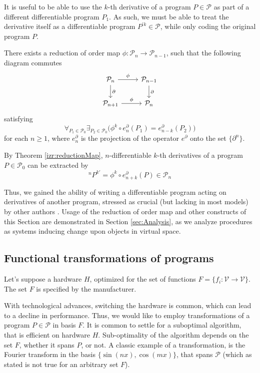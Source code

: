 \documentclass[smallcondensed]{svjour3}
\newcommand{\VV}{\mathcal{V}}
\newcommand{\dP}{\mathcal{P}}
\newcommand{\D}{\partial}
\begin{document}
 It is useful to be able to use the $k$-th derivative of a program $P\in\dP$ as part of a different differentiable program $P_1$. As such, we must be able to treat the derivative itself as a differentiable program $P^{\prime k}\in\dP$, while only coding the original program $P$. 
\begin{theorem}\label{izr:reductionMap}
There exists a reduction of order map $\phi:\dP_n\to \dP_{n-1}$, such that the
following  diagram commutes
\begin{equation}\label{eq:reductionMap}
\begin{tikzcd}
  \dP_n \arrow{r}{\phi} \arrow{d}{\D} & 
  \dP_{n-1} \arrow{d}{\D}\\
  \dP_{n+1} \arrow{r}{\phi} & 
  \dP_{n}
\end{tikzcd}
\end{equation}
satisfying
\begin{equation}
\forall_{P_1\in\dP_0}\exists_{P_2\in\dP_0}\Big(\phi^k\circ e^\D_n(P_1)=e^\D_{n-k}(P_2)\Big)
\end{equation}
for each $n\ge 1$, where $e^\D_n$ is the projection of the operator $e^\D$ onto the set $\{\D^n\}$.
\end{theorem}  
\begin{corollary}\label{cor:extraxtDerivatives}
By Theorem \ref{izr:reductionMap}, $n$-differentiable $k$-th derivatives of a program $P\in\dP_0$ can be extracted by
\begin{equation}
^{n}P^{k\prime}=\phi^k\circ e^\D_{n+k}(P)\in\dP_n
\end{equation}
\end{corollary}    
 Thus, we gained the ability of writing a differentiable program acting on derivatives of another program, stressed as crucial (but lacking in most models) by other authors \cite{AD1}. Usage of the reduction of order map and other constructs of this Section are demonstrated in Section \ref{sec:Analysis}, as we analyze procedures as systems inducing change upon objects in virtual space.
 
   \subsection{Functional transformations of programs}\label{sec:FTP}
   
   Let's suppose a hardware $H$, optimized for the set of functions
   $F=\{f_i:\VV\to \VV\}$. The set $F$ is specified by the manufacturer.  
   
   With technological advances, switching the hardware is common, which can lead
   to a decline in performance.  Thus, we would like to employ transformations
   of a program $P\in\dP$ in basis $F$. It is common to settle for a suboptimal
   algorithm, that is efficient on hardware $H$. Sub-optimality of the algorithm
   depends on the set $F$, whether it spans $P$, or not. A classic example of a
   transformation, is the Fourier transform in the basis $\{\sin(nx),
   \cos(mx)\}$, that spans $\dP$ (which as stated is not true for an arbitrary
   set $F$).
   
\end{document}
